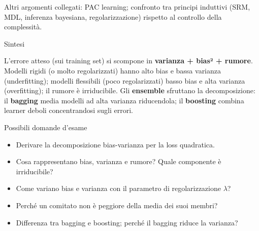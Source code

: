 Altri argomenti collegati: PAC learning; confronto tra principi
induttivi (SRM, MDL, inferenza bayesiana, regolarizzazione) rispetto al
controllo della complessità.

\begin{boxabstract}{Sintesi}

L'errore atteso (sui training set) si scompone in \textbf{varianza +
bias² + rumore}. Modelli rigidi (o molto regolarizzati) hanno alto bias
e bassa varianza (underfitting); modelli flessibili (poco regolarizzati)
basso bias e alta varianza (overfitting); il rumore è irriducibile. Gli
\textbf{ensemble} sfruttano la decomposizione: il \textbf{bagging} media
modelli ad alta varianza riducendola; il \textbf{boosting} combina
learner deboli concentrandosi sugli errori.

\end{boxabstract}

\begin{boxquestion}{Possibili domande d'esame}

\begin{itemize}
\tightlist
\item
  Derivare la decomposizione bias-varianza per la loss quadratica.
\item
  Cosa rappresentano bias, varianza e rumore? Quale componente è
  irriducibile?
\item
  Come variano bias e varianza con il parametro di regolarizzazione
  \(\lambda\)?
\item
  Perché un comitato non è peggiore della media dei suoi membri?
\item
  Differenza tra bagging e boosting; perché il bagging riduce la
  varianza?
\end{itemize}

\end{boxquestion}
